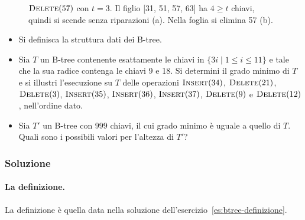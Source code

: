 \begin{figure}[htbp]
\centering
{}
\caption{$\textsc{Delete}(57)$ con $t = 3$. Il figlio [31, 51, 57, 63] ha $4 \ge t$ chiavi, quindi si scende senza riparazioni (a). Nella foglia si elimina 57 (b).}
\label{fig:es-btree23-D57}
\end{figure}

\begin{esercizio}\label{es:btree-2020}
\begin{itemize}
    \item[(1)] Si definisca la struttura dati dei B-tree.
    \item[(2)] Sia $T$ un B-tree contenente esattamente le chiavi in $\{3i \mid 1 \le i \le 11\}$ e tale che la sua radice contenga le chiavi 9 e 18. Si determini il grado minimo di $T$ e si illustri l'esecuzione su $T$ delle operazioni $\textsc{Insert}(34)$, $\textsc{Delete}(21)$, $\textsc{Delete}(3)$, $\textsc{Insert}(35)$, $\textsc{Insert}(36)$, $\textsc{Insert}(37)$, $\textsc{Delete}(9)$ e $\textsc{Delete}(12)$, nell'ordine dato.
    \item[(3)] Sia $T'$ un B-tree con $999$ chiavi, il cui grado minimo è uguale a quello di $T$. Quali sono i possibili valori per l'altezza di $T'$?
\end{itemize}
\end{esercizio}

\subsubsection*{Soluzione}

\paragraph{La definizione.}
La definizione è quella data nella soluzione dell'esercizio~\ref{es:btree-definizione}.

